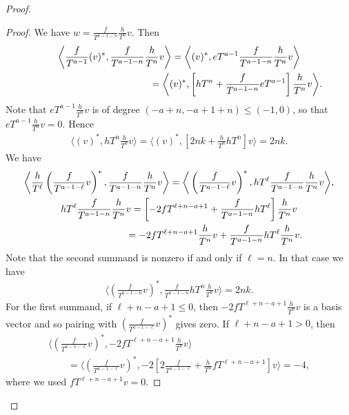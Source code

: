 \documentclass[11pt]{article}
\numberwithin{equation}{section}
\begin{document}
\begin{proof}
\begin{proof}
We have $w = \frac{f}{T^{a-1-n}}\frac{h}{T^n} v $. Then
\begin{gather*}
\bigg\langle \frac{f}{T^{a-1}} (v)^*, \frac{f}{T^{a-1-n}}\frac{h}{T^n} v \bigg\rangle = \bigg\langle (v)^*, eT^{a-1} \frac{f}{T^{a-1-n}}\frac{h}{T^n} v \bigg\rangle \\
\hphantom{\bigg\langle \frac{f}{T^{a-1}} (v)^*, \frac{f}{T^{a-1-n}}\frac{h}{T^n} v \bigg\rangle }
= \bigg\langle (v)^*, \left[ hT^n + \frac{f}{T^{a-1-n}} eT^{a-1} \right] \frac{h}{T^n} v \bigg\rangle.
\end{gather*}
Note that $eT^{a-1} \frac{h}{T^n}v$ is of degree $(-a+n, -a+1+n) \leq (-1,0)$, so that $eT^{a-1} \frac{h}{T^n} v = 0$. Hence
\begin{gather*}
\bigg\langle (v)^*, hT^n \frac{h}{T^n} v \bigg\rangle = \bigg\langle (v)^*, \left[2nk + \frac{h}{T^n} hT^n\right] v \bigg\rangle = 2 n k.
\end{gather*}
We have
\begin{gather*}
\bigg\langle \frac{h}{T^{\ell}} \left(\frac{f}{T^{a-1-\ell}}v\right)^*,
\frac{f}{T^{a-1-n}}\frac{h}{T^n} v \bigg\rangle = \bigg\langle \left(\frac{f}{T^{a-1-\ell}}v\right)^*, hT^{\ell} \frac{f}{T^{a-1-n}}\frac{h}{T^n} v \bigg\rangle,\\
hT^{\ell} \frac{f}{T^{a-1-n}}\frac{h}{T^n} v = \left[ -2 fT^{\ell+n-a+1} + \frac{f}{T^{a-1-n}} hT^{\ell} \right] \frac{h}{T^n} v \\
\hphantom{hT^{\ell} \frac{f}{T^{a-1-n}}\frac{h}{T^n} v} = -2 fT^{\ell+n-a+1} \frac{h}{T^n} v + \frac{f}{T^{a-1-n}} hT^{\ell} \frac{h}{T^n} v.
\end{gather*}
Note that the second summand is nonzero if and only if $\ell=n$. In that case we have
\begin{gather*}
\bigg\langle \left(\frac{f}{T^{a-1-n}}v\right)^*, \frac{f}{T^{a-1-n}} hT^n \frac{h}{T^n} v \bigg\rangle = 2nk.
\end{gather*}
For the first summand, if $\ell+n-a+1 \leq 0$, then $-2 fT^{\ell+n-a+1} \frac{h}{T^n} v$ is a basis vector and so pairing with $\left(\frac{f}{T^{a-1-\ell}}v\right)^*$ gives zero. If $\ell+n-a+1 > 0$, then
\begin{gather*}
\bigg\langle \left(\frac{f}{T^{a-1-\ell}}v\right)^*, -2 fT^{\ell+n-a+1} \frac{h}{T^n} v \bigg\rangle \\
\qquad {} = \bigg\langle \left(\frac{f}{T^{a-1-\ell}}v\right)^*, -2 \left[ 2\frac{f}{T^{a-1-\ell}} + \frac{h}{T^n} fT^{\ell+n-a+1}\right] v \bigg\rangle = - 4,
\end{gather*}
where we used $fT^{\ell+n-a+1}v = 0$.


\end{proof}
\end{proof}
\end{document}
